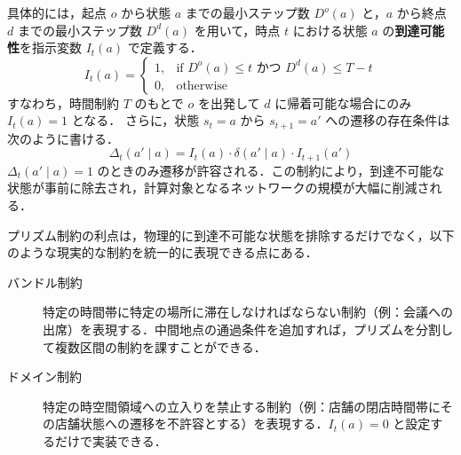 具体的には，起点 $o$ から状態 $a$ までの最小ステップ数 $D^o(a)$ と，$a$ から終点 $d$ までの最小ステップ数 $D^d(a)$ を用いて，時点 $t$ における状態 $a$ の\textbf{到達可能性}を指示変数 $I_t(a)$ で定義する．
\begin{equation}\label{eq:prism-indicator}
  I_t(a) = \begin{cases} 1, & \text{if } D^o(a) \leq t \text{ かつ } D^d(a) \leq T - t \\ 0, & \text{otherwise} \end{cases}
\end{equation}
すなわち，時間制約 $T$ のもとで $o$ を出発して $d$ に帰着可能な場合にのみ $I_t(a) = 1$ となる．
さらに，状態 $s_t = a$ から $s_{t+1} = a'$ への遷移の存在条件は次のように書ける．
\begin{equation}\label{eq:prism-transition}
  \Delta_t(a' \mid a) = I_t(a) \cdot \delta(a' \mid a) \cdot I_{t+1}(a')
\end{equation}
$\Delta_t(a' \mid a) = 1$ のときのみ遷移が許容される．この制約により，到達不可能な状態が事前に除去され，計算対象となるネットワークの規模が大幅に削減される．

プリズム制約の利点は，物理的に到達不可能な状態を排除するだけでなく，以下のような現実的な制約を統一的に表現できる点にある．
\begin{description}
  \item[バンドル制約] 特定の時間帯に特定の場所に滞在しなければならない制約（例：会議への出席）を表現する．中間地点の通過条件を追加すれば，プリズムを分割して複数区間の制約を課すことができる．
  \item[ドメイン制約] 特定の時空間領域への立入りを禁止する制約（例：店舗の閉店時間帯にその店舗状態への遷移を不許容とする）を表現する．$I_t(a) = 0$ と設定するだけで実装できる．
\end{description}

